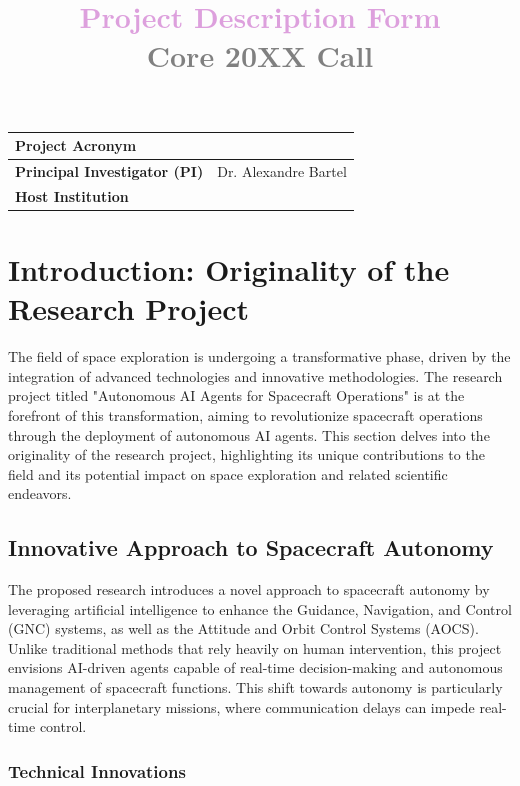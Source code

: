 \documentclass[a4paper, 11pt]{article}
\title{\bf \textcolor{Plum}{Project Description Form} \\ \textcolor{Gray}{Core 20XX Call}}
\author{\vspace{-5ex}}
\date{\vspace{-5ex}}
\begin{document}
\vspace{10cm}
\maketitle

\begin{center}
\begin{tabular}{|p{4.5cm}|p{}|}
\hline
\bf Project Acronym  &  \\ \hline
\bf Principal Investigator (PI)  &  Dr. Alexandre Bartel \\ \hline
\bf Host Institution  & \\ \hline
\end{tabular}
\end{center}

\newpage
\section{Introduction: Originality of the Research Project}

The field of space exploration is undergoing a transformative phase, driven by the integration of advanced technologies and innovative methodologies. The research project titled "Autonomous AI Agents for Spacecraft Operations" is at the forefront of this transformation, aiming to revolutionize spacecraft operations through the deployment of autonomous AI agents. This section delves into the originality of the research project, highlighting its unique contributions to the field and its potential impact on space exploration and related scientific endeavors.

\subsection{Innovative Approach to Spacecraft Autonomy}

The proposed research introduces a novel approach to spacecraft autonomy by leveraging artificial intelligence to enhance the Guidance, Navigation, and Control (GNC) systems, as well as the Attitude and Orbit Control Systems (AOCS). Unlike traditional methods that rely heavily on human intervention, this project envisions AI-driven agents capable of real-time decision-making and autonomous management of spacecraft functions. This shift towards autonomy is particularly crucial for interplanetary missions, where communication delays can impede real-time control.

\subsubsection{Technical Innovations}
\end{document}
